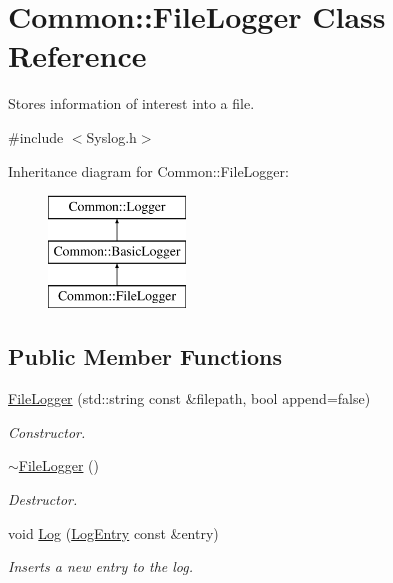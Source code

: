 \hypertarget{class_common_1_1_file_logger}{\section{Common\-:\-:File\-Logger Class Reference}
\label{class_common_1_1_file_logger}
}


Stores information of interest into a file.  




{\ttfamily \#include $<$Syslog.\-h$>$}

Inheritance diagram for Common\-:\-:File\-Logger\-:\begin{figure}[H]
\begin{center}
\leavevmode
\includegraphics[height=3.000000cm]{class_common_1_1_file_logger}
\end{center}
\end{figure}
\subsection*{Public Member Functions}
\begin{DoxyCompactItemize}
\item 
\hyperlink{class_common_1_1_file_logger_a23395819e1621d8825a9685fbc61857c}{File\-Logger} (std\-::string const \&filepath, bool append=false)
\begin{DoxyCompactList}\small\item\em Constructor. \end{DoxyCompactList}\item 
\hypertarget{class_common_1_1_file_logger_ab08af44f2de3fe1b51158132f9a399dd}{\hyperlink{class_common_1_1_file_logger_ab08af44f2de3fe1b51158132f9a399dd}{$\sim$\-File\-Logger} ()}\label{class_common_1_1_file_logger_ab08af44f2de3fe1b51158132f9a399dd}

\begin{DoxyCompactList}\small\item\em Destructor. \end{DoxyCompactList}\item 
\hypertarget{class_common_1_1_file_logger_a2f487ff3e7c10476f371e5cc7166a6f3}{void \hyperlink{class_common_1_1_file_logger_a2f487ff3e7c10476f371e5cc7166a6f3}{Log} (\hyperlink{class_common_1_1_log_entry}{Log\-Entry} const \&entry)}\label{class_common_1_1_file_logger_a2f487ff3e7c10476f371e5cc7166a6f3}

\begin{DoxyCompactList}\small\item\em Inserts a new entry to the log. \end{DoxyCompactList}\end{DoxyCompactItemize}
